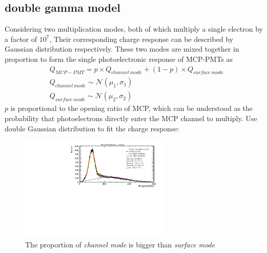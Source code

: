 \documentclass{article}
\begin{document}
\subsection{double gamma model}\label{subsec:doublegamma}
Considering two multiplication modes, both of which multiply a single electron by a factor of $10^7$,
Their corresponding charge response can be described by Gaussian distribution respectively.
These two modes are mixed together in proportion to form the single photoelectronic response of MCP-PMTs as 
\begin{equation}
    \label{eq:doublegaus}
    \begin{aligned}
         & Q_{MCP-PMT} = p\times Q_{channel\  mode} + (1-p)\times Q_{surface\  mode} \\
         & Q_{channel\  mode} \sim \mathcal{N} (\mu_1, \sigma_1)                     \\
         & Q_{surface\  mode} \sim \mathcal{N} (\mu_2, \sigma_2)
    \end{aligned}
\end{equation}
$p$ is proportional to the opening ratio of MCP, which can be understood as the probability that photoelectrons directly enter the MCP channel to multiply.
Use double Gaussian distribution to fit the charge response:
\begin{figure}[ht]
    \centering
    \includegraphics[height=5cm]{pic/doubleGauss.pdf}
    \caption{The proportion of \textit{channel mode} is bigger than \textit{surface mode}}\label{fig:doubleGauss}
\end{figure}
\end{document}
